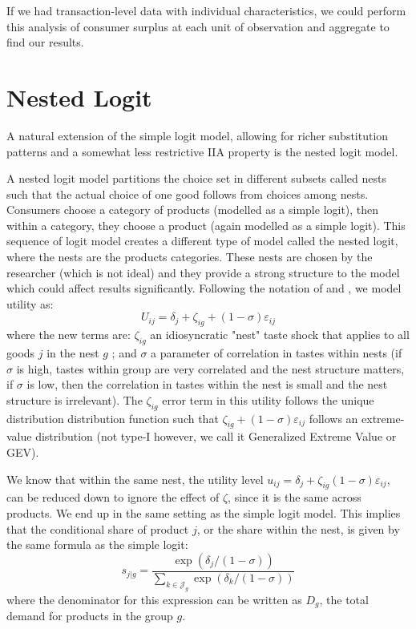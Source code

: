 \documentclass[12pt]{report}
\begin{document}
If we had transaction-level data with individual characteristics, we could perform this analysis of consumer surplus at each unit of observation and aggregate to find our results.

\section{Nested Logit}

A natural extension of the simple logit model, allowing for richer substitution patterns and a somewhat less restrictive IIA property is the nested logit model.

A nested logit model partitions the choice set in different subsets called nests such that the actual choice of one good follows from choices among nests. Consumers choose a category of products (modelled as a simple logit), then within a category, they choose a product (again modelled as a simple logit). This sequence of logit model creates a different type of model called the nested logit, where the nests are the products categories. These nests are chosen by the researcher (which is not ideal) and they provide a strong structure to the model which could affect results significantly. Following the notation of \cite{cardell91} and \cite{berry94}, we model utility as: $$U_{ij} = \delta_j + \zeta_{ig} + (1 - \sigma)\varepsilon_{ij} $$ where the new terms are: $\zeta_{ig}$ an idiosyncratic "nest" taste shock that applies to all goods $j$ in the nest $g$ ; and $\sigma$ a parameter of correlation in tastes within nests (if $\sigma$ is high, tastes within group are very correlated and the nest structure matters, if $\sigma$ is low, then the correlation in tastes within the nest is small and the nest structure is irrelevant). The $\zeta_{ig}$ error term in this utility follows the unique distribution distribution function such that $\zeta_{ig} + (1 - \sigma)\varepsilon_{ij}$ follows an extreme-value distribution (not type-I however, we call it Generalized Extreme Value or GEV).

We know that within the same nest, the utility level  $u_{ij} = \delta_j + \zeta_{ig} (1 - \sigma)\varepsilon_{ij}$, can be reduced down to ignore the effect of $\zeta$, since it is the same across products. We end up in the same setting as the simple logit model. This implies that the conditional share of product $j$, or the share within the nest, is given by the same formula as the simple logit: $$s_{j\vert g} = \frac{\exp(\delta_j/(1-\sigma))}{\sum_{k\in\mathcal{J}_g} \exp(\delta_k/(1-\sigma))} $$ where the denominator for this expression can be written as $D_g$, the total demand for products in the group $g$.
\end{document}

